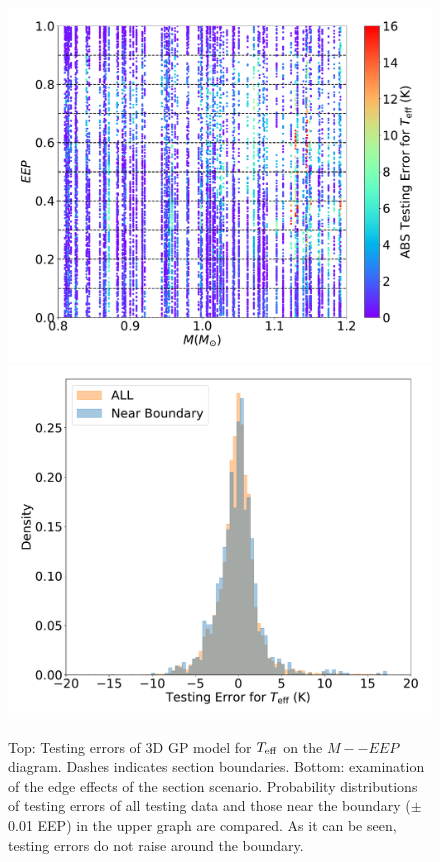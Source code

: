  \begin{figure}
	\includegraphics[width=1.0\columnwidth]{3d-testing_teff-10sections.pdf}
	\includegraphics[width=1.0\columnwidth]{3d-testing_teff-hist-10sections.pdf}	
    \caption{Top: Testing errors of 3D GP model for $T_{\rm eff}$ on the $M -- EEP$ diagram. Dashes indicates section boundaries. Bottom: examination of the edge effects of the section scenario. Probability distributions of testing errors of all testing data and those near the boundary ($\pm$0.01 EEP) in the upper graph are compared.  As it can be seen, testing errors do not raise around the boundary. }  
    \label{fig:3dtest}
\end{figure}


